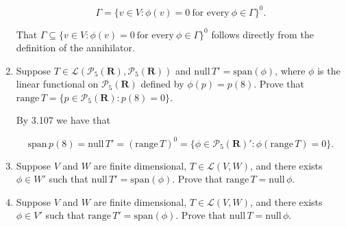 \documentclass{book}
\begin{document}
\begin{enumerate}
\begin{equation*}
    \Gamma=\{v \in V:\phi(v)=0 \ \textrm{for every} \ \phi \in \Gamma\}^0.
\end{equation*}

That \(\Gamma \subseteq \{v \in V:\phi(v) = 0 \ \textrm{for every} \ \phi \in \Gamma\}^0\) follows directly from the definition of the annihilator.




\item Suppose \(T \in \mathcal{L}(\mathcal{P}_5(\textbf{R}),\mathcal{P}_5(\textbf{R}))\) and \(\textrm{null} \, T'=\textrm{span}(\phi)\), where \(\phi\) is the linear functional on \(\mathcal{P}_5(\textbf{R})\) defined by \(\phi(p)=p(8)\).  Prove that \(\textrm{range} \, T = \{p \in \mathcal{P}_5(\textbf{R}):p(8)=0\}\).

By 3.107 we have that

\begin{equation*}
    \text{span} \, p(8) = \text{null} \, T' = (\text{range} \, T)^0 = \{\phi \in \mathcal{P}_5(\textbf{R})':\phi (\text{range} \, T) = 0\}.
\end{equation*}



\item Suppose \(V\) and \(W\) are finite dimensional, \(T \in \mathcal{L}(V,W)\), and there exists \(\phi \in W'\) such that \(\textrm{null} \, T' = \textrm{span}(\phi)\).  Prove that \(\textrm{range} \, T = \textrm{null} \, \phi\).

\item Suppose \(V\) and \(W\) are finite dimensional, \(T \in \mathcal{L}(V,W)\), and there exists \(\phi \in V'\) such that \(\textrm{range} \, T' = \textrm{span}(\phi)\).  Prove that \(\textrm{null} \, T = \textrm{null} \, \phi\).


\end{enumerate}
\end{document}

